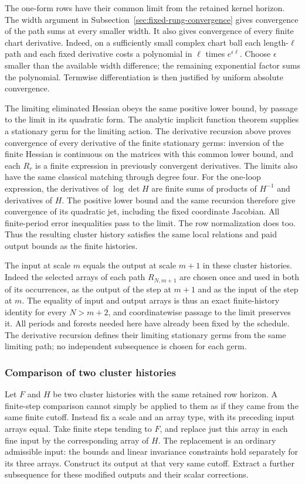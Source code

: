 The one-form rows have their common limit from the retained kernel
horizon. The width argument in
Subsection~\ref{sec:fixed-rung-convergence} gives convergence of
the path sums at every smaller width. It also gives convergence
of every finite chart derivative. Indeed, on a sufficiently
small complex chart ball each length-$\ell$ path and each fixed
derivative costs a polynomial in $\ell$ times $e^{\epsilon\ell}$.
Choose $\epsilon$ smaller than the available width difference;
the remaining exponential factor sums the polynomial. Termwise
differentiation is then justified by uniform absolute convergence.

The limiting eliminated Hessian obeys the same positive lower
bound, by passage to the limit in its quadratic form. The analytic
implicit function theorem supplies a stationary germ for the
limiting action. The derivative recursion above proves convergence
of every derivative of the finite stationary germs: inversion
of the finite Hessian is continuous on the matrices with this
common lower bound, and each $R_r$ is a finite expression in
previously convergent derivatives. The limits also have the same
classical matching through degree four. For the one-loop expression,
the derivatives of $\log\det H$ are finite sums of products of
$H^{-1}$ and derivatives of $H$. The positive lower bound and
the same recursion therefore give convergence of its quadratic
jet, including the fixed coordinate Jacobian. All finite-period
error inequalities pass to the limit. The row normalization does
too. Thus the resulting cluster history satisfies the same local
relations and paid output bounds as the finite histories.

The input at scale $m$ equals the output at scale $m+1$ in these
cluster histories. Indeed the selected arrays of each path
$R_{N,m+1}$ are chosen once and used in both of its occurrences, as
the output of the step at $m+1$ and as the input of the step at $m$.
The equality of input and output arrays is thus an exact
finite-history identity for every $N>m+2$, and coordinatewise passage
to the limit preserves it. All periods and forests needed here
have already been fixed by the schedule. The derivative recursion
defines their limiting stationary germs from the same limiting
path; no independent subsequence is chosen for each germ.

\subsubsection{Comparison of two cluster histories}
Let $F$ and $H$ be two cluster histories with the same retained
row horizon. A finite-step comparison cannot simply be applied
to them as if they came from the same finite cutoff. Instead fix
a scale and an array type, with its preceding input arrays equal.
Take finite steps tending to $F$, and replace just this array in
each fine input by the corresponding array of $H$. The replacement
is an ordinary admissible input: the bounds and linear invariance
constraints hold separately for its three arrays. Construct its
output at that very same cutoff. Extract a further subsequence
for these modified outputs and their scalar corrections.

